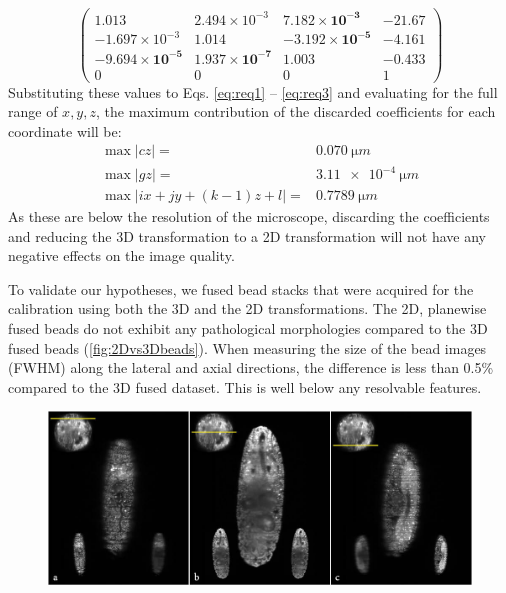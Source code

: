   \[
  \begin{pmatrix}
    1.013 & 2.494\times 10^{-3} & \mathbf{7.182\times 10^{-3}} & -21.67 \\
    -1.697\times 10^{-3} & 1.014 & \mathbf{-3.192\times 10^{-5}} & -4.161 \\
    \mathbf{-9.694\times 10^{-5}} & \mathbf{1.937\times 10^{-7}} & \mathbf{1.003} & \mathbf{-0.433} \\
    0 & 0 & 0 & 1
  \end{pmatrix}
  \]
  Substituting these values to Eqs. \ref{eq:req1} -- \ref{eq:req3} and evaluating for the full range of $x, y, z$, the maximum contribution of the discarded coefficients for each coordinate will be:
  \begin{align*}
    \max |cz| =& \SI{0.070}{\micro m}  \\
    \max |gz| =& \SI{3.11e-4}{\micro m}  \\
    \max | i x + j y + (k-1)  z + l | =& \SI{0.7789}{\micro m}
  \end{align*}
  As these are below the resolution of the microscope, discarding the coefficients and reducing the 3D transformation to a 2D transformation will not have any negative effects on the image quality.

  

  To validate our hypotheses, we fused bead stacks that were acquired for the calibration using both the 3D and the 2D transformations. The 2D, planewise fused beads do not exhibit any pathological morphologies compared to the 3D fused beads (\autoref{fig:2Dvs3Dbeads}). When measuring the size of the bead images (FWHM) along the lateral and axial directions, the difference is less than 0.5\% compared to the 3D fused dataset. This is well below any resolvable features.

  \begin{figure}[b]
    \centering
    \includegraphics[width=1\textwidth]{fusion/drosophila_D2}
    \label{fig:drosophila_D2}
  \end{figure}

